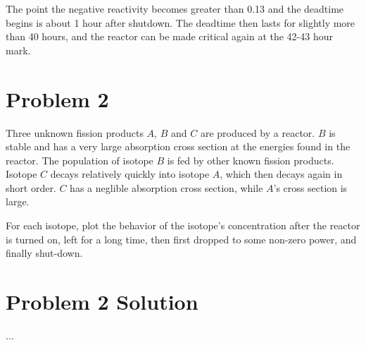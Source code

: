 \documentclass{report}
\begin{document}
\begin{enumerate}[a)]
The point the negative reactivity becomes greater than 0.13 and the deadtime begins is about 1 hour after shutdown. The deadtime then lasts for slightly more than 40 hours, and the reactor can be made critical again at the 42-43 hour mark.


\end{enumerate}



\newpage
\section*{Problem 2}

Three unknown fission products $A$, $B$ and $C$ are produced by a reactor. $B$ is stable and has a very large absorption cross section at the energies found in the reactor. The population of isotope $B$ is fed by other known fission products. Isotope $C$ decays relatively quickly into isotope $A$, which then decays again in short order. $C$ has a neglible absorption cross section, while $A$'s cross section is large. 

For each isotope, plot the behavior of the isotope's concentration after the reactor is turned on, left for a long time, then first dropped to some non-zero power, and finally shut-down.



\section*{Problem 2 Solution}

...
\end{document}
